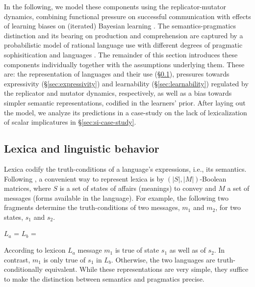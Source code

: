 \documentclass[a4paper]{article}
\begin{document}
In the following, we model these components using the replicator-mutator dynamics, combining functional pressure on successful communication with effects of learning biases on (iterated) Bayesian learning \citep{griffiths+kalish:2007}. The semantics-pragmatics distinction and its bearing on production and comprehension are captured by a probabilistic model of rational language use with different degrees of pragmatic sophisitication and languages \citep{frank+goodman:2012,franke+jaeger:2014, bergen+etal:2016}. The remainder of this section introduces these components individually together with the assumptions underlying them. These are: the representation of languages and their use (\S\ref{sec:languages+use}), pressures towards expressivity (\S\ref{sec:expressivity}) and learnability (\S\ref{sec:learnability}) regulated by the replicator and mutator dynamics, respectively, as well as a bias towards simpler semantic representations, codified in the learners' prior. After laying out the model, we analyze its predictions in a case-study on the lack of lexicalization of scalar implicatures in \S\ref{sec:si-case-study}.  



\subsection{Lexica and linguistic behavior}\label{sec:languages+use}
Lexica codify the truth-conditions of a language's expressions, i.e., its semantics. Following \citet{franke+jaeger:2014}, a convenient way to represent lexica is by $(|S|,|M|)$-Boolean matrices, where $S$ is a set of states of affairs (meanings) to convey and $M$ a set of messages (forms available in the language). For example, the following two fragments determine the truth-conditions of two messages, $m_1$ and $m_2$, for two states, $s_1$ and $s_2$.

\begin{centering}
$L_a$ =  \hspace{2cm} $L_b$ = \\[0.5cm]
\end{centering}


According to lexicon $L_a$ message $m_1$ is true of state $s_1$ as well as of $s_2$. In contrast, $m_1$ is only true of $s_1$ in $L_b$. Otherwise, the two languages are truth-conditionally equivalent. While these representations are very simple, they suffice to make the distinction between semantics and pragmatics precise. 
\end{document}
